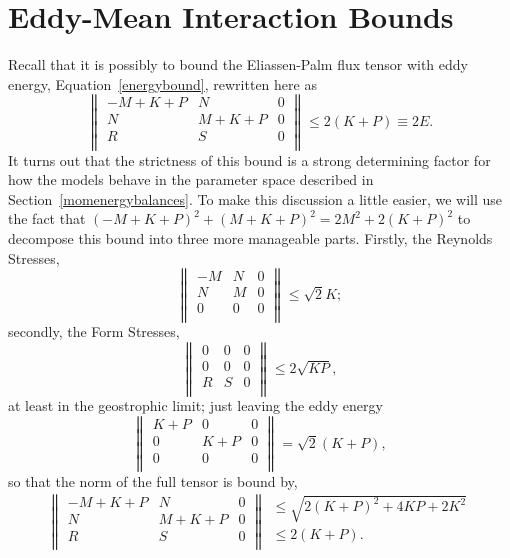 \documentclass[12pt,a4paper]{report}
\newcommand*\equref[1]{Equation~\eqref{#1}}
\newcommand*\secref[1]{Section~\ref{#1}}
\begin{document}
\section{Eddy-Mean Interaction Bounds}

Recall that it is possibly to bound the Eliassen-Palm flux tensor with eddy energy, \equref{energybound}, rewritten here as
\begin{equation}
{\left\|\begin{array}{ccc}
		-M + K + P & N & 0 \\
		N & M + K + P& 0 \\
		R & S & 0 \\
		\end{array}\right\|\leq 2\left(K+P\right)\equiv 2E}.
\end{equation} 
It turns out that the strictness of this bound is
a strong determining factor for how the models behave in the parameter space described in
\secref{momenergybalances}. To make this discussion a little easier, we will use the
fact that $(-M + K + P)^{2}+(M + K + P)^{2} = 2M^{2}+ 2(K + P)^{2}$ to decompose
this bound into three more manageable parts. Firstly, the Reynolds Stresses,
\begin{equation}
{\left\|\begin{array}{ccc}
	-M & N & 0\\
	N & M & 0\\
	0 & 0 & 0\\
	\end{array}\right\|\leq \sqrt{2}K};
\label{reynoldbound}
\end{equation} 
secondly, the Form Stresses,
\begin{equation}
{\left\|\begin{array}{ccc}
	0 & 0 & 0\\
	0 & 0 & 0\\
	R & S & 0\\
	\end{array}\right\|\leq 2\sqrt{KP}},
\end{equation} 
at least in the geostrophic limit;
just leaving the eddy energy
\begin{equation}
{\left\|\begin{array}{ccc}
	K + P & 0 & 0 \\
	0 & K + P & 0\\
	0 & 0 & 0\\
	\end{array}\right\| = \sqrt{2}(K + P)},
\label{formbound}
\end{equation} 
so that the norm of the full tensor is bound by,
\begin{equation}
{\left\|\begin{array}{ccc}
	-M + K + P & N & 0 \\
	N & M + K + P & 0\\
	R & S & 0\\
	\end{array}\right\| 
	\begin{array}{c}
	\leq \sqrt{2(K + P)^{2}+4KP+2K^{2}} \\
	\leq 2(K+P).\\
	\end{array}}
\end{equation} 
\end{document}
